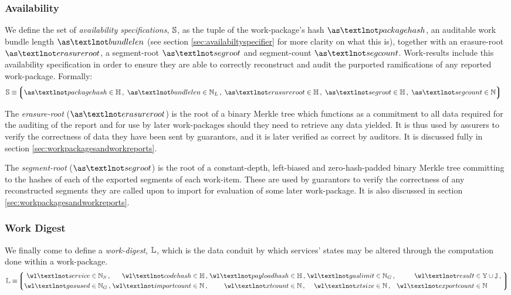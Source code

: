 \subsubsection{Availability}
We define the set of \emph{availability specifications}, $\mathbb{S}$, as the tuple of the work-package's hash $\as¬packagehash$, an auditable work bundle length $\as¬bundlelen$ (see section \ref{sec:availabiltyspecifier} for more clarity on what this is), together with an erasure-root $\as¬erasureroot$, a segment-root $\as¬segroot$ and segment-count $\as¬segcount$. Work-results include this availability specification in order to ensure they are able to correctly reconstruct and audit the purported ramifications of any reported work-package. Formally:
\begin{align}
  \avspec &\equiv \tuple{
    \isa{\as¬packagehash}{\hash}\,,\;
    \isa{\as¬bundlelen}{\bloblength}\,,\;
    \isa{\as¬erasureroot}{\hash}\,,\;
    \isa{\as¬segroot}{\hash}\,,\;
    \isa{\as¬segcount}{\N}
  }
\end{align}

The \emph{erasure-root} ($\as¬erasureroot$) is the root of a binary Merkle tree which functions as a commitment to all data required for the auditing of the report and for use by later work-packages should they need to retrieve any data yielded. It is thus used by assurers to verify the correctness of data they have been sent by guarantors, and it is later verified as correct by auditors. It is discussed fully in section \ref{sec:workpackagesandworkreports}.

The \emph{segment-root} ($\as¬segroot$) is the root of a constant-depth, left-biased and zero-hash-padded binary Merkle tree committing to the hashes of each of the exported segments of each work-item. These are used by guarantors to verify the correctness of any reconstructed segments they are called upon to import for evaluation of some later work-package. It is also discussed in section \ref{sec:workpackagesandworkreports}.

\subsubsection{Work Digest}
We finally come to define a \emph{work-digest}, $\mathbb{L}$, which is the data conduit by which services' states may be altered through the computation done within a work-package.
\begin{equation}\label{eq:workdigest}
  \mathbb{L} \equiv \tuple{
    \begin{alignedat}{9}
      \isa{\wl¬service&}{\serviceid}\,,\;
      \isa{&\wl¬codehash&}{\hash}\,,\;
      \isa{&\wl¬payloadhash&}{\hash}\,,\;
      \isa{&\wl¬gaslimit&}{\gas}\,,\;
      \isa{&\wl¬result&}{\blob \cup \mathbb{J}}\,,\;\\
      \isa{\wl¬gasused&}{\gas}\,,\; %
      \isa{&\wl¬importcount&}{\N}\,,\; %
      \isa{&\wl¬xtcount&}{\N}\,,\; %
      \isa{&\wl¬xtsize&}{\N}\,,\; %
      \isa{&\wl¬exportcount&}{\N} %
    \end{alignedat}
  }
\end{equation}

